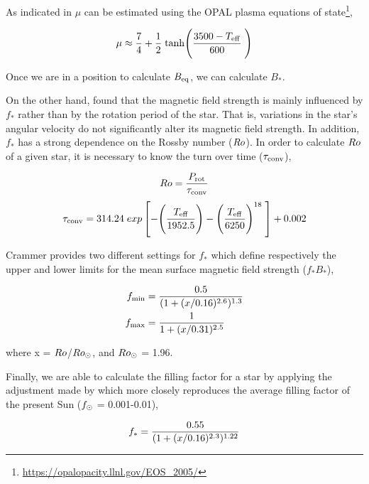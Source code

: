 \documentclass[fleqn,usenatbib]{mnras}
\begin{document}
As indicated in \cite{Cranmer2011} $\mu$ can be estimated using the OPAL plasma equations of state\footnote{\url{https://opalopacity.llnl.gov/EOS_2005/}},
\begin{ceqn}
\begin{equation}
    \mu \approx \frac{7}{4} + \frac{1}{2} \; {\rm tanh}\Bigg(\frac{3500-T_{\mathrm{eff}}}{600}\;\Bigg) \label{eq:mf_atom_weight}
\end{equation}
\end{ceqn}
Once we are in a position to calculate $B_{\mathrm{eq}}$, we can calculate $B_*$.\par

On the other hand, \cite{Cranmer2011} found that the magnetic field strength is mainly influenced by $f_*$ rather than by the rotation period of the star. That is, variations in the star's angular velocity do not significantly alter its magnetic field strength. In addition, $f_*$ has a strong dependence on the Rossby number ($Ro$). In order to calculate $Ro$ of a given star, it is necessary to know the turn over time ($\tau_{\mathrm{conv}}$),
\begin{ceqn}
\begin{equation}
    Ro = \frac{P_{\mathrm{rot}}}{\tau_{\mathrm{conv}}} \label{eq:mf_rossby}
\end{equation}
\begin{equation}
    \tau_{\mathrm{conv}} = 314.24\;exp\left[-\Bigg(\frac{T_{\mathrm{eff}}}{1952.5}\Bigg)-\Bigg(\frac{T_{\mathrm{eff}}}{6250}\Bigg)^{18} \;\right]+0.002 \label{eq:mf_turnover}
\end{equation}
\end{ceqn}
\cite{Cranmer2011} Crammer provides two different settings for $f_*$ which define respectively the upper and lower limits for the mean surface magnetic field strength ($f_*B_*$),

\begin{ceqn}
\begin{align}
     f_{\mathrm{min}} &= \frac{0.5}{(1+(x/0.16)^{2.6})^{1.3}} \label{eq:fmin}\\
     f_{\mathrm{max}} &= \frac{1}{1+(x/0.31)^{2.5}} \label{eq:fmax}
\end{align}
\end{ceqn}
where x = $Ro$/$Ro_\odot$, and $Ro_\odot$ = 1.96.


Finally, we are able to calculate the filling factor for a star by applying the adjustment made by \cite{Gallet2013} which more closely reproduces the average filling factor of the present Sun ($f_{\mathrm{\odot}}$ = 0.001-0.01),
\begin{ceqn}
\begin{equation}
     f_{\mathrm{*}} = \frac{0.55}{(1+(x/0.16)^{2.3})^{1.22}} \label{eq:fstart}
\end{equation}
\end{ceqn}
\end{document}
